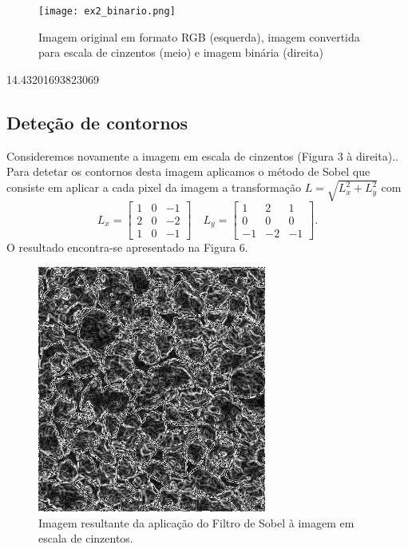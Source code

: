 \documentclass[aps,pre,twocolumn,showpacs,amsmath,amssymb]{revtex4-1}
\begin{document}
    \begin{figure}[hbt!]
        \begin{center}
            \texttt{[image: ex2\_binario.png]} \\
            \caption{Imagem original em formato RGB (esquerda), imagem convertida para escala de cinzentos (meio) e imagem binária (direita)}
            \label{fig.exemplo}
        \end{center}
    \end{figure}

    14.43201693823069

\subsection{Deteção de contornos}
Consideremos novamente a imagem em escala de cinzentos (Figura 3 à direita).. Para detetar os contornos desta imagem aplicamos o método de Sobel que consiste em aplicar a cada pixel da imagem a transformação $L=\sqrt{L_x^2+L_y^2}$ com
\begin{equation}
  L_x=  \begin{bmatrix}
        1 & 0 & -1\\
        2 & 0 & -2\\
        1 & 0 & -1
    \end{bmatrix} \quad
  L_y=  \begin{bmatrix}
        1 & 2 & 1\\
        0 & 0 & 0\\
        -1 & -2 & -1
    \end{bmatrix}.
\end{equation}
O resultado encontra-se apresentado na Figura 6.
\begin{figure}[hbt!]
    \centering
    \includegraphics[width=\columnwidth]{edgedetected.png}
    \caption{Imagem resultante da aplicação do Filtro de Sobel à imagem em escala de cinzentos.}
    \label{edgedetection}
\end{figure}
\end{document}
